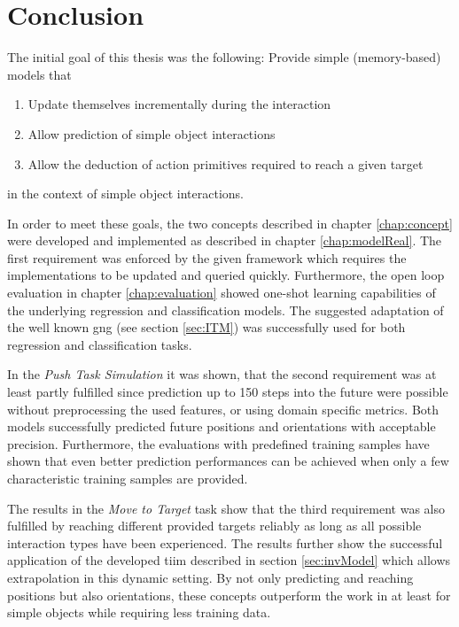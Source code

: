 \chapter{Conclusion \label{chap:conclusion}}



The initial goal of this thesis was the following:
Provide simple (memory-based) models that
\begin{enumerate}
\item Update themselves incrementally during the interaction
\item Allow prediction of simple object interactions
\item Allow the deduction of action primitives required to reach a given target
\end{enumerate}
in the context of simple object interactions.

In order to meet these goals, the two concepts described in chapter \ref{chap:concept} were developed and implemented as described in chapter \ref{chap:modelReal}. 
The first requirement was enforced by the given framework which requires the implementations to be updated and queried quickly. Furthermore, the open loop evaluation in chapter \ref{chap:evaluation} showed one-shot learning capabilities of the underlying regression and classification models. The suggested adaptation of the well known \gls{gng} (see section \ref{sec:ITM}) was successfully used for both regression and classification tasks.

In the \textit{Push Task Simulation} it was shown, that the second requirement was at least partly fulfilled since prediction up to 150 steps into the future were possible without preprocessing the used features, or using domain specific metrics. Both models successfully predicted future positions and orientations with acceptable precision. Furthermore, the evaluations with predefined training samples have shown that even better prediction performances can be achieved when only a few characteristic training samples are provided. 

The results in the \textit{Move to Target} task show that the third requirement was also fulfilled by reaching different provided targets reliably as long as all possible interaction types have been experienced. The results further show the successful application of the developed \gls{tiim} described in section \ref{sec:invModel} which allows extrapolation in this dynamic setting.
By not only predicting and reaching positions but also orientations, these concepts outperform the work in \cite{pushing} at least for simple objects while requiring less training data. 

